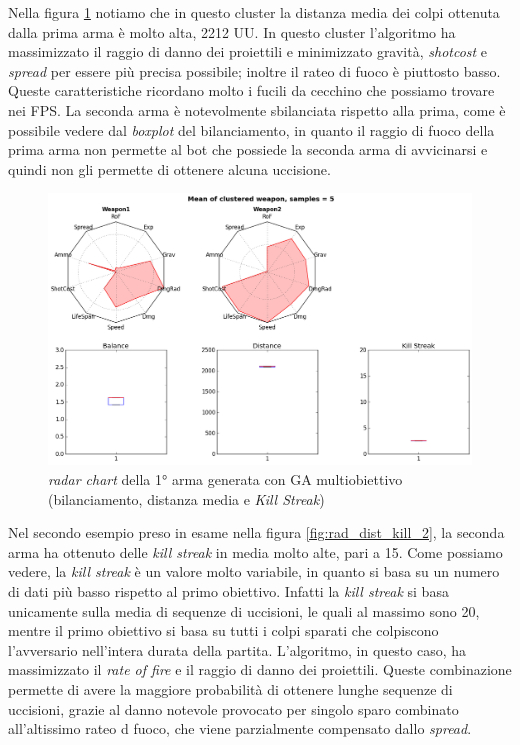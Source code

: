 \documentclass[12pt, italian]{toptesi}
\begin{document}
Nella figura \ref{fig:rad_dist_kill_1} notiamo che in questo cluster la distanza media dei colpi ottenuta dalla prima arma è molto alta, 2212 UU. In questo cluster l'algoritmo ha massimizzato il raggio di danno dei proiettili e minimizzato gravità, \emph{shotcost} e \emph{spread} per essere più precisa possibile;  inoltre il rateo di fuoco è piuttosto basso. Queste caratteristiche ricordano molto i fucili da cecchino che possiamo trovare nei FPS. La seconda arma è notevolmente sbilanciata rispetto alla prima, come è possibile vedere dal \emph{boxplot} del bilanciamento, in quanto il raggio di fuoco della prima arma non permette al bot che possiede la seconda arma di avvicinarsi e quindi non gli permette di ottenere alcuna uccisione.
\begin{figure}[tp]
\centering
\includegraphics[width=1.0\textwidth]{rad_dist_kill_1}
\caption{\emph{radar chart} della 1°  arma generata con GA multiobiettivo (bilanciamento, distanza media e \emph{Kill Streak})}
\label{fig:rad_dist_kill_1}
\end{figure}
Nel secondo esempio preso in esame nella figura \ref{fig:rad_dist_kill_2}, la seconda arma ha ottenuto delle \emph{kill streak} in media molto alte, pari a 15. Come possiamo vedere, la \emph{kill streak} è un valore molto variabile, in quanto si basa su un numero di dati più basso rispetto al primo obiettivo. Infatti la \emph{kill streak} si basa unicamente sulla media di sequenze di uccisioni, le quali al massimo sono 20, mentre il primo obiettivo si basa su tutti i colpi sparati che colpiscono l'avversario nell'intera durata della partita.
L'algoritmo, in questo caso, ha massimizzato il \emph{rate of fire} e il raggio di danno dei proiettili. Queste combinazione permette di avere la maggiore probabilità di ottenere lunghe sequenze di uccisioni, grazie al danno notevole provocato per singolo sparo combinato all'altissimo rateo d fuoco, che viene parzialmente compensato dallo \emph{spread}.
\end{document}
